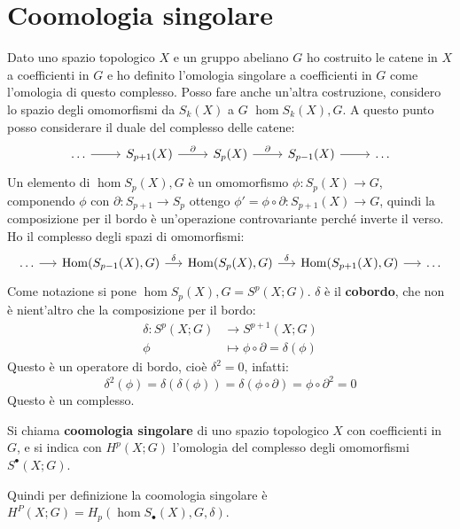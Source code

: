 \section{Coomologia singolare}

Dato uno spazio topologico $ X $ e un gruppo abeliano $ G $ ho costruito le
catene in $ X $ a coefficienti in $ G $ e ho definito l'omologia singolare a
coefficienti in $ G $ come l'omologia di questo complesso. Posso fare anche un'altra
costruzione, considero lo spazio degli omomorfismi da $ S_k(X) $ a $ G $
$ \hom{S_k(X), G} $. A questo punto posso considerare il duale del complesso delle catene:
\[
  \begin{tikzcd}
    \dots \rar & S_{p+1}(X) \rar{\partial} & S_p(X) \rar{\partial} & S_{p-1}(X) \rar & \dots
  \end{tikzcd}
\]
Un elemento di $ \hom{S_p(X), G} $ è un omomorfismo $ \phi \colon S_p(X) \to G $, componendo $ \phi $
con $ \partial \colon S_{p+1} \to S_p $ ottengo  $ \phi' = \phi \circ \partial \colon S_{p+1}(X) \to G $, quindi la composizione
per il bordo è un'operazione controvariante perché inverte il verso. Ho il complesso degli spazi
di omomorfismi:
\[
  \begin{tikzcd}[nodes = {column sep = 14 pt}]
    \dots \rar & \hom{S_{p-1}(X),G} \rar{\delta} & \hom{S_p(X),G} \rar{\delta} & \hom{S_{p+1}(X),G} \rar & \dots
  \end{tikzcd}
\]
Come notazione si pone $ \hom{S_p(X),G} = S^p(X;G) $. $ \delta $ è il \textbf{cobordo},
che non è nient'altro che la composizione per il bordo:
\begin{align*}
  \delta \colon S^p(X;G) & \to S^{p+1}(X;G) \\
  \phi & \mapsto \phi \circ \partial = \delta(\phi)
\end{align*}
Questo è un operatore di bordo, cioè $ \delta^2 = 0 $, infatti:
\[
  \delta^2(\phi) = \delta(\delta(\phi)) = \delta (\phi \circ \partial) = \phi \circ \partial^2 = 0
\]
Questo è un complesso.
\begin{definition}
  Si chiama \textbf{coomologia singolare} di uno
  spazio topologico $ X $ con coefficienti in $ G $, e si indica con
  $ H^p(X; G) $ l'omologia del complesso degli omomorfismi $ S^\bullet(X;G) $.
\end{definition}
Quindi per definizione la coomologia singolare è $ H^P(X;G) = H_p(\hom{S_\bullet(X), G}, \delta) $.

